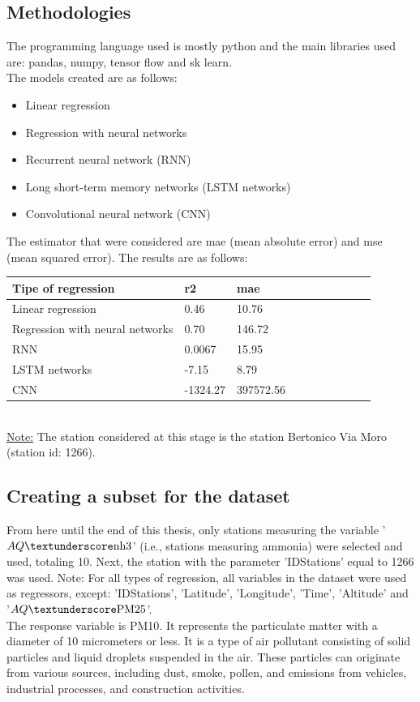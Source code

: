 \subsection{Methodologies}
The programming language used is mostly python and the main libraries used are: pandas, numpy, tensor flow and sk learn.
\\The models created are as follows:
\begin{itemize}
    \item Linear regression
    \item Regression with neural networks
    \item Recurrent neural network (RNN)
    \item Long short-term memory networks (LSTM networks)
    \item Convolutional neural network (CNN)
\end{itemize}
The estimator that were considered are mae (mean absolute error) and mse (mean squared error). The results are as follows:
\begin{table}[!ht]
    \centering
    \begin{tabular}{|l|l|l|l|l|l|l|l|l|l|}
    \hline
        \textbf{Tipe of regressio}n & \textbf{r2} & \textbf{mae} \\ \hline
        Linear regression & 0.46 & 10.76 \\ \hline
        Regression with neural networks & 0.70 & 146.72 \\ \hline
        RNN & 0.0067 & 15.95 \\ \hline
        LSTM networks & -7.15 & 8.79 \\ \hline
        CNN & -1324.27 & 397572.56 \\ \hline
  
    \end{tabular}
\end{table}
\\\underline{Note:} The station considered at this stage is the station Bertonico Via Moro (station id: 1266).

\subsection{Creating a subset for the dataset}
From here until the end of this thesis, only stations measuring the variable '$AQ\textunderscore\text{nh}{3}$' (i.e., stations measuring ammonia) were selected and used, totaling 10. Next, the station with the parameter 'IDStations' equal to 1266 was used. 
Note: For all types of regression, all variables in the dataset were used as regressors, except: 'IDStations', 'Latitude', 'Longitude', 'Time', 'Altitude' and '$AQ\textunderscore\text{PM}{25}$'.
\\The response variable is PM10. It represents the particulate matter with a diameter of 10 micrometers or less. It is a type of air pollutant consisting of solid particles and liquid droplets suspended in the air. These particles can originate from various sources, including dust, smoke, pollen, and emissions from vehicles, industrial processes, and construction activities.

